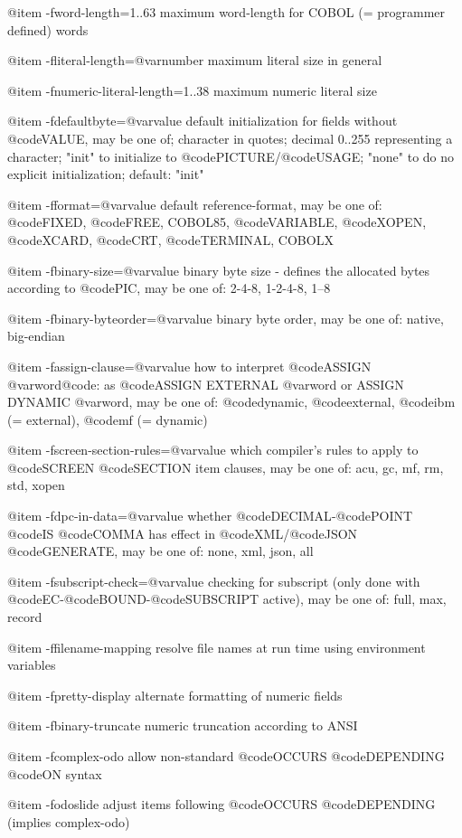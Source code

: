 @item -fword-length=1..63
maximum word-length for COBOL (= programmer defined) words

@item -fliteral-length=@var{number}
maximum literal size in general

@item -fnumeric-literal-length=1..38
maximum numeric literal size

@item -fdefaultbyte=@var{value}
default initialization for fields without @code{VALUE}, may be one of; character in quotes; decimal 0..255 representing a character; "init" to initialize to @code{PICTURE}/@code{USAGE}; "none" to do no explicit initialization; default: "init"

@item -fformat=@var{value}
default reference-format, may be one of: @code{FIXED}, @code{FREE}, COBOL85, @code{VARIABLE}, @code{XOPEN}, @code{XCARD}, @code{CRT}, @code{TERMINAL}, COBOLX

@item -fbinary-size=@var{value}
binary byte size - defines the allocated bytes according to @code{PIC}, may be one of: 2-4-8, 1-2-4-8, 1--8

@item -fbinary-byteorder=@var{value}
binary byte order, may be one of: native, big-endian

@item -fassign-clause=@var{value}
how to interpret @code{ASSIGN @var{word}@code{: as @code{ASSIGN EXTERNAL @var{word}} or }ASSIGN DYNAMIC @var{word}}, may be one of: @code{dynamic}, @code{external}, @code{ibm} (= external), @code{mf} (= dynamic)

@item -fscreen-section-rules=@var{value}
which compiler's rules to apply to @code{SCREEN} @code{SECTION} item clauses, may be one of: acu, gc, mf, rm, std, xopen

@item -fdpc-in-data=@var{value}
whether @code{DECIMAL}-@code{POINT} @code{IS} @code{COMMA} has effect in @code{XML}/@code{JSON} @code{GENERATE}, may be one of: none, xml, json, all

@item -fsubscript-check=@var{value}
checking for subscript (only done with @code{EC}-@code{BOUND}-@code{SUBSCRIPT} active), may be one of: full, max, record

@item -ffilename-mapping
resolve file names at run time using environment variables

@item -fpretty-display
alternate formatting of numeric fields

@item -fbinary-truncate
numeric truncation according to ANSI

@item -fcomplex-odo
allow non-standard @code{OCCURS} @code{DEPENDING} @code{ON} syntax

@item -fodoslide
adjust items following @code{OCCURS} @code{DEPENDING} (implies complex-odo)

